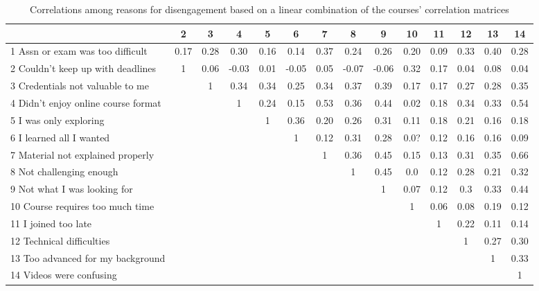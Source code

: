\documentclass{sigchi}\usepackage[]{graphicx}\usepackage[]{color}
\begin{document}
\begin{table}
\label{tab:s1reascor}
\caption{Correlations among reasons for disengagement based on a linear combination of the courses' correlation matrices}
\small
\center
\begin{tabular}{lccccccccccccc}
\toprule
 & 2 & 3 & 4 & 5 & 6 & 7 & 8 & 9 & 10 & 11 & 12 & 13 & 14 \\
\midrule
1 Assn or exam was too difficult    & 0.17 & 0.28 & 0.30 & 0.16 & 0.14 & 0.37 & 0.24 & 0.26 & 0.20 & 0.09 & 0.33 & 0.40 & 0.28 \\
2 Couldn't keep up with deadlines   & 1 & 0.06 & -0.03 & 0.01 & -0.05 & 0.05 & -0.07 & -0.06 & 0.32 & 0.17 & 0.04 & 0.08 & 0.04 \\
3 Credentials not valuable to me    &   & 1 & 0.34 & 0.34 & 0.25 & 0.34 & 0.37 & 0.39 & 0.17 & 0.17 & 0.27 & 0.28 & 0.35 \\
4 Didn't enjoy online course format &   &  & 1 & 0.24 & 0.15 & 0.53 & 0.36 & 0.44 & 0.02 & 0.18 & 0.34 & 0.33 & 0.54 \\
5 I was only exploring              &   &  &  & 1 & 0.36 & 0.20 & 0.26 & 0.31 & 0.11 & 0.18 & 0.21 & 0.16 & 0.18 \\
6 I learned all I wanted            &   &  &  &  & 1 & 0.12 & 0.31 & 0.28 & 0.0? & 0.12 & 0.16 & 0.16 & 0.09 \\
7 Material not explained properly   &   &  &  &  &  & 1 & 0.36 & 0.45 & 0.15 & 0.13 & 0.31 & 0.35 & 0.66 \\
8 Not challenging enough            &   &  &  &  &  &  & 1 & 0.45 & 0.0 & 0.12 & 0.28 & 0.21 & 0.32 \\
9 Not what I was looking for        &   &  &  &  &  &  &  & 1 & 0.07 & 0.12 & 0.3 & 0.33 & 0.44 \\
10 Course requires too much time    &   &  &  &  &  &  &  &  & 1 & 0.06 & 0.08 & 0.19 & 0.12 \\
11 I joined too late                &   &  &  &  &  &  &  &  &  & 1 & 0.22 & 0.11 & 0.14 \\
12 Technical difficulties           &   &  &  &  &  &  &  &  &  &  & 1 & 0.27 & 0.30 \\
13 Too advanced for my background   &   &  &  &  &  &  &  &  &  &  &  & 1 & 0.33 \\
14 Videos were confusing            &   &  &  &  &  &  &  &  &  &  &  &  & 1 \\
\bottomrule
\end{tabular}
\end{table}
\end{document}
